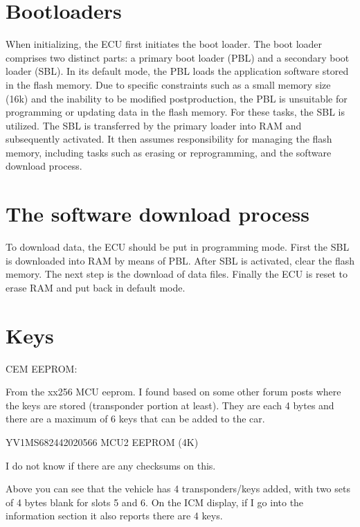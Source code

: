 \documentclass[letterpaper,10pt,english]{sphinxmanual}
\begin{document}
\section{Bootloaders}
\label{\detokenize{hacking/bootloaders:bootloaders}}\label{\detokenize{hacking/bootloaders::doc}}
\noindent{}

\sphinxAtStartPar
When initializing, the ECU first initiates the boot loader. The boot loader comprises two distinct parts: a primary boot loader (PBL) and a secondary boot loader (SBL). In its default mode, the PBL loads the application software stored in the flash memory. Due to specific constraints such as a small memory size (16k) and the inability to be modified post\sphinxhyphen{}production, the PBL is unsuitable for programming or updating data in the flash memory. For these tasks, the SBL is utilized. The SBL is transferred by the primary loader into RAM and subsequently activated. It then assumes responsibility for managing the flash memory, including tasks such as erasing or reprogramming, and the software download process.


\section{The software download process}
\label{\detokenize{hacking/bootloaders:the-software-download-process}}
\sphinxAtStartPar
To download data, the ECU should be put in programming mode. First the SBL is
downloaded into RAM by means of PBL. After SBL is activated, clear the flash memory. The next step is the download of
data files. Finally the ECU is reset to erase RAM and put back in default mode.


\section{Keys}
\label{\detokenize{hacking/keys:keys}}\label{\detokenize{hacking/keys::doc}}
\sphinxAtStartPar
CEM EEPROM:

\sphinxAtStartPar
From the xx256 MCU eeprom. I found based on some other forum posts where the keys are stored (transponder portion at least). They are each 4 bytes and there are a maximum of 6 keys that can be added to the car.

\sphinxAtStartPar
YV1MS682442020566 MCU2 EEPROM (4K)

\sphinxAtStartPar
I do not know if there are any checksums on this.

\sphinxAtStartPar
Above you can see that the vehicle has 4 transponders/keys added, with two sets of 4 bytes blank for slots 5 and 6.  On the ICM display, if I go into the information section it also reports there are 4 keys.
\end{document}
